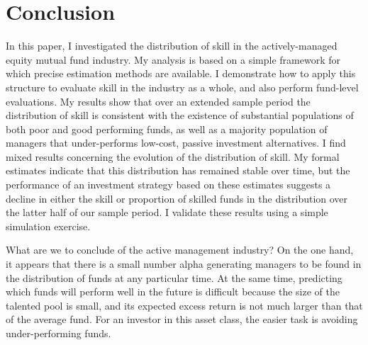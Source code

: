 \section{Conclusion}
\label{sec:conclusion}
In this paper, I investigated the distribution of skill in the actively-managed equity mutual fund industry. My analysis is based on a simple framework for which precise estimation methods are available. I demonstrate how to apply this structure to evaluate skill in the industry as a whole, and also perform fund-level evaluations. My results show that over an extended sample period the distribution of skill is consistent with the existence of substantial populations of both poor and good performing funds, as well as a majority population of managers that under-performs low-cost, passive investment alternatives. I find mixed results concerning the evolution of the distribution of skill. My formal estimates indicate that this distribution has remained stable over time, but the performance of an investment strategy based on these estimates suggests a decline in either the skill or proportion of skilled funds in the distribution over the latter half of our sample period. I validate these results using a simple simulation exercise.

What are we to conclude of the active management industry? On the one hand, it appears that there is a small number alpha generating managers to be found in the distribution of funds at any particular time. At the same time, predicting which funds will perform well in the future is difficult because the size of the talented pool is small, and its expected excess return is not much larger than that of the average fund. For an investor in this asset class, the easier task is avoiding under-performing funds.
